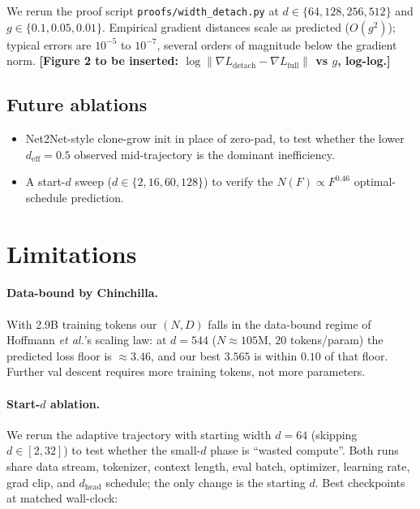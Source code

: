 \documentclass{article}
\begin{document}
We rerun the proof script \texttt{proofs/width\_detach.py} at
$d \in \{64, 128, 256, 512\}$ and $g \in \{0.1, 0.05, 0.01\}$.  Empirical
gradient distances scale as predicted ($O(g^2)$); typical errors are
$10^{-5}$ to $10^{-7}$, several orders of magnitude below the gradient norm.
\textbf{[Figure 2 to be inserted: $\log\|\nabla L_{\mathrm{detach}} -
\nabla L_{\mathrm{full}}\|$ vs $g$, log-log.]}

\subsection{Future ablations}
\label{sec:ablations}

\begin{itemize}
\item Net2Net-style clone-grow init in place of zero-pad, to test
  whether the lower $d_{\text{eff}}{=}0.5$ observed mid-trajectory is
  the dominant inefficiency.
\item A start-$d$ sweep ($d \in \{2, 16, 60, 128\}$) to verify the
  $N(F) \propto F^{0.46}$ optimal-schedule prediction.
\end{itemize}

\section{Limitations}
\label{sec:limitations}

\paragraph{Data-bound by Chinchilla.}
With 2.9B training tokens our $(N, D)$ falls in the data-bound regime
of Hoffmann \emph{et al.}'s scaling law: at $d{=}544$ ($N \approx
105$M, $20$ tokens/param) the predicted loss floor is $\approx 3.46$,
and our best $3.565$ is within $0.10$ of that floor.  Further val
descent requires more training tokens, not more parameters.

\paragraph{Start-$d$ ablation.}
We rerun the adaptive trajectory with starting width $d{=}64$
(skipping $d \in [2, 32]$) to test whether the small-$d$ phase is
``wasted compute''.  Both runs share data stream, tokenizer, context
length, eval batch, optimizer, learning rate, grad clip, and
$d_{\text{head}}$ schedule; the only change is the starting $d$.
Best checkpoints at matched wall-clock:
\end{document}
